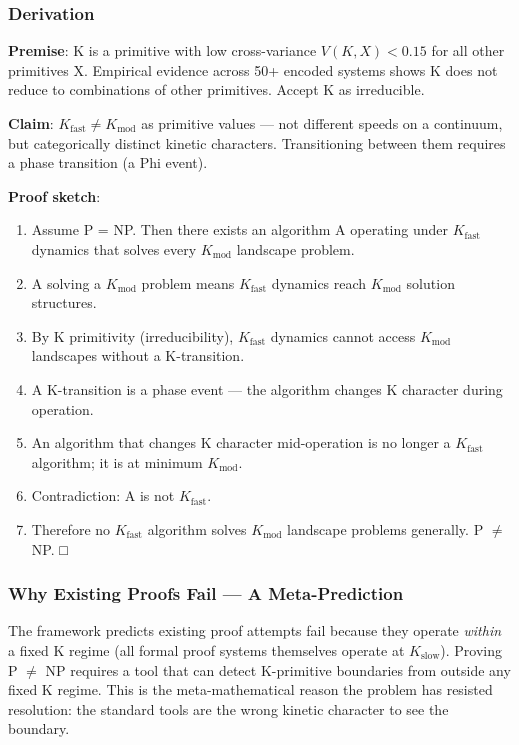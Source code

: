 \documentclass[12pt,a4paper]{article}
\begin{document}
\subsubsection{Derivation}

\textbf{Premise}: K is a primitive with low cross-variance $V(K, X) < 0.15$ for all other primitives X. Empirical evidence across 50+ encoded systems shows K does not reduce to combinations of other primitives. Accept K as irreducible.

\textbf{Claim}: $K_{\text{fast}} \neq K_{\text{mod}}$ as primitive values --- not different speeds on a continuum, but categorically distinct kinetic characters. Transitioning between them requires a phase transition (a Phi event).

\textbf{Proof sketch}:

\begin{enumerate}
    \item Assume P = NP. Then there exists an algorithm A operating under $K_{\text{fast}}$ dynamics that solves every $K_{\text{mod}}$ landscape problem.
    \item A solving a $K_{\text{mod}}$ problem means $K_{\text{fast}}$ dynamics reach $K_{\text{mod}}$ solution structures.
    \item By K primitivity (irreducibility), $K_{\text{fast}}$ dynamics cannot access $K_{\text{mod}}$ landscapes without a K-transition.
    \item A K-transition is a phase event --- the algorithm changes K character during operation.
    \item An algorithm that changes K character mid-operation is no longer a $K_{\text{fast}}$ algorithm; it is at minimum $K_{\text{mod}}$.
    \item Contradiction: A is not $K_{\text{fast}}$.
    \item Therefore no $K_{\text{fast}}$ algorithm solves $K_{\text{mod}}$ landscape problems generally. P $\neq$ NP. □
\end{enumerate}

\subsubsection{Why Existing Proofs Fail --- A Meta-Prediction}

The framework predicts existing proof attempts fail because they operate \emph{within} a fixed K regime (all formal proof systems themselves operate at $K_{\text{slow}}$). Proving P $\neq$ NP requires a tool that can detect K-primitive boundaries from outside any fixed K regime. This is the meta-mathematical reason the problem has resisted resolution: the standard tools are the wrong kinetic character to see the boundary.
\end{document}
